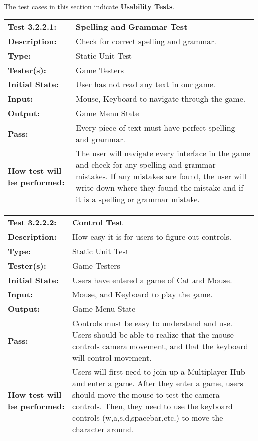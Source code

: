 \documentclass[12pt, titlepage]{article}
\begin{document}
\paragraph{}The test cases in this section indicate \textbf{Usability Tests}.

\begin{mdframed}[linewidth=1pt]
\begin{tabularx}{\textwidth}{@{}p{3cm}X@{}}
{\bf Test 3.2.2.1:} & {\bf Spelling and Grammar Test}\\[\baselineskip]
{\bf Description:} & Check for correct spelling and grammar.\\[0.5\baselineskip]
{\bf Type:} & Static Unit Test\\[0.5\baselineskip]
{\bf Tester(s):} & Game Testers\\[0.5\baselineskip]
{\bf Initial State:} & User has not read any text in our game.\\[0.5\baselineskip]
{\bf Input:} & Mouse, Keyboard to navigate through the game.\\[0.5\baselineskip]
{\bf Output:} & Game Menu State\\[0.5\baselineskip]
{\bf Pass:} & Every piece of text must have perfect spelling and grammar.\\[0.5\baselineskip]
{\bf How test will be performed:} & The user will navigate every interface in the game and check for any spelling and grammar mistakes. If any mistakes are found, the user will write down where they found the mistake and if it is a spelling or grammar mistake. 
\end{tabularx}
\end{mdframed}

\begin{mdframed}[linewidth=1pt]
\begin{tabularx}{\textwidth}{@{}p{3cm}X@{}}
{\bf Test 3.2.2.2:} & {\bf Control Test}\\[\baselineskip]
{\bf Description:} & How easy it is for users to figure out controls.\\[0.5\baselineskip]
{\bf Type:} & Static Unit Test\\[0.5\baselineskip]
{\bf Tester(s):} & Game Testers\\[0.5\baselineskip]
{\bf Initial State:} & Users have entered a game of Cat and Mouse. \\[0.5\baselineskip]
{\bf Input:} & Mouse, and Keyboard to play the game.\\[0.5\baselineskip]
{\bf Output:} & Game Menu State\\[0.5\baselineskip]
{\bf Pass:} & Controls must be easy to understand and use. Users should be able to realize that the mouse controls camera movement, and that the keyboard will control movement.\\[0.5\baselineskip]
{\bf How test will be performed:} & Users will first need to join up a Multiplayer Hub and enter a game. After they enter a game, users should move the mouse to test the camera controls. Then, they need to use the keyboard controls (w,a,s,d,spacebar,etc.) to move the character around.
\end{tabularx}
\end{mdframed}				
\end{document}
